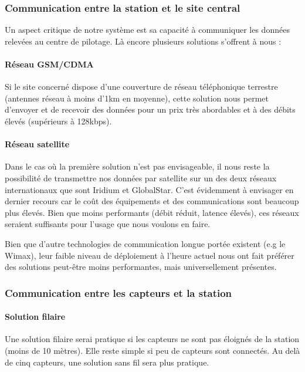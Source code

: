 \subsubsection{Communication entre la station et le site central}

Un aspect critique de notre système est sa capacité à communiquer les données relevées au centre de pilotage. Là encore plusieurs solutions s’offrent à nous :

\paragraph{Réseau GSM/CDMA}

Si le site concerné dispose d’une couverture de réseau téléphonique terrestre (antennes réseau à moins d’1km en moyenne), cette solution nous permet d’envoyer et de recevoir des données pour un prix très abordables et à des débits élevés (supérieurs à 128kbps).

\paragraph{Réseau satellite}

Dans le cas où la première solution n’est pas envisageable, il nous reste la possibilité de transmettre nos données par satellite sur un des deux réseaux internationaux que sont Iridium et GlobalStar. C’est évidemment à envisager en dernier recours car le coût des équipements et des communications sont beaucoup plus élevés. Bien que moins performants (débit réduit, latence élevés), ces réseaux seraient suffisants pour l’usage que nous voulons en faire.

Bien que d’autre technologies de communication longue portée existent (e.g le Wimax), leur faible niveau de déploiement à l’heure actuel nous ont fait préférer des solutions peut-être moins performantes, mais universellement présentes.

\subsubsection{Communication entre les capteurs et la station}

\paragraph{Solution filaire}
Une solution filaire serai pratique si les capteurs ne sont pas éloignés de la station (moins de 10 mètres). Elle reste simple si peu de capteurs sont connectés.
Au delà de cinq capteurs, une solution sans fil sera plus pratique.\\

